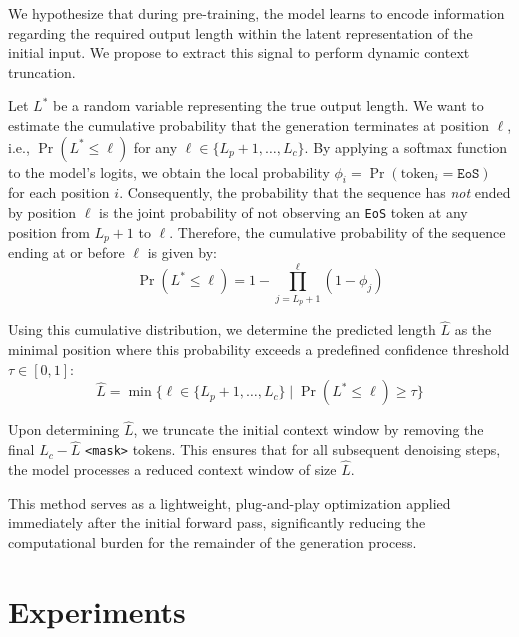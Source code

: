 \documentclass{article}
\theoremstyle{plain}
\theoremstyle{definition}
\theoremstyle{remark}
\begin{document}
We hypothesize that during pre-training, the model learns to encode information regarding the required output length within the latent representation of the initial input. We propose to extract this signal to perform dynamic context truncation.

Let $L^*$ be a random variable representing the true output length. We want to estimate the cumulative probability that the generation terminates at position $\ell$, i.e., $\Pr(L^* \le \ell)$ for any $\ell \in \{L_p+1, \dots, L_c\}$. By applying a softmax function to the model's logits, we obtain the local probability $\phi_{i} = \Pr(\text{token}_i = \texttt{EoS})$ for each position $i$. Consequently, the probability that the sequence has \emph{not} ended by position $\ell$ is the joint probability of not observing an \texttt{EoS} token at any position from $L_p+1$ to $\ell$. Therefore, the cumulative probability of the sequence ending at or before $\ell$ is given by:
\begin{equation}
\Pr(L^* \le \ell) = 1 - \prod_{j=L_p+1}^{\ell} (1 - \phi_j)
\end{equation}

Using this cumulative distribution, we determine the predicted length $\hat{L}$ as the minimal position where this probability exceeds a predefined confidence threshold $\tau\in[0,1]$:
\begin{equation}
\hat{L} = \min \{ \ell \in \{L_p+1, \dots, L_c\} \mid \Pr(L^* \le \ell) \ge \tau \}
\end{equation}

Upon determining $\hat{L}$, we truncate the initial context window by removing the final $L_c-\hat{L}$ \texttt{<mask>} tokens. This ensures that for all subsequent denoising steps, the model processes a reduced context window of size $\hat{L}$.

This method serves as a lightweight, plug-and-play optimization applied immediately after the initial forward pass, significantly reducing the computational burden for the remainder of the generation process.

\section{Experiments}
\label{sec:experiments}
\end{document}
